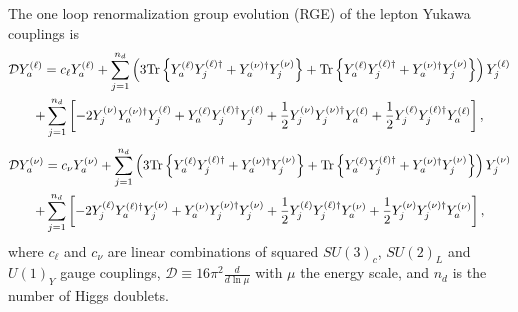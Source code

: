 \documentclass[12pt,a4paper]{article}
\begin{document}
The one loop renormalization group evolution (RGE) of the lepton Yukawa couplings is
\begin{multline}\label{eq:RGE:YL:00}
 \mathcal D \YL{a}=c_{\ell}\YL{a}+\sum_{j=1}^{n_d}\left(3\TR{\YL{a}\YLd{j}+\YNd{a}\YN{j}}+\TR{\YL{a}\YLd{j}+\YNd{a}\YN{j}}\right)\YL{j}\\ +\sum_{j=1}^{n_d}\left[-2\YN{j}\YNd{a}\YL{j}+\YL{a}\YLd{j}\YL{j}+\frac{1}{2}\YN{j}\YNd{j}\YL{a}+\frac{1}{2}\YL{j}\YLd{j}\YL{a}\right],
\end{multline}
%
\begin{multline}\label{eq:RGE:YN:00}
 \mathcal D \YN{a}=c_{\nu}\YN{a}+\sum_{j=1}^{n_d}\left(3\TR{\YL{a}\YLd{j}+\YNd{a}\YN{j}}+\TR{\YL{a}\YLd{j}+\YNd{a}\YN{j}}\right)\YN{j}\\ +\sum_{j=1}^{n_d}\left[-2\YL{j}\YLd{a}\YN{j}+\YN{a}\YNd{j}\YN{j}+\frac{1}{2}\YL{j}\YLd{j}\YN{a}+\frac{1}{2}\YN{j}\YNd{j}\YN{a}\right],
\end{multline}
where $c_{\ell}$ and $c_{\nu}$ are linear combinations of squared $SU(3)_c$, $SU(2)_L$ and $U(1)_Y$ gauge couplings, $\mathcal D\equiv 16\pi^2\frac{d}{d\ln\mu}$ with $\mu$ the energy scale, and $n_d$ is the number of Higgs doublets.
\end{document}
